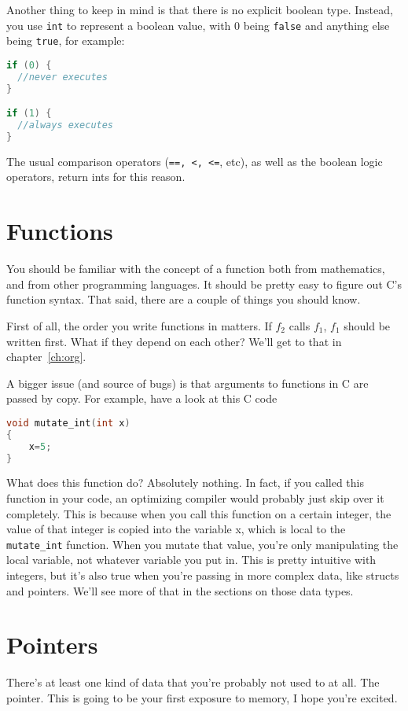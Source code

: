 \documentclass[ebook,11pt,oneside,openany]{memoir}
\newcommand{\cf}[1]{\texttt{#1}}
\begin{document}
Another thing to keep in mind is that there is no explicit boolean type. Instead, you use \texttt{int} to represent a boolean value, with 0 being \texttt{false} and anything else being \texttt{true}, for example:

\begin{lstlisting}[language=C]
if (0) {
  //never executes
}

if (1) {
  //always executes
}
\end{lstlisting}

The usual comparison operators (\texttt{==, <, <=}, etc), as well as the boolean logic operators, return ints for this reason.

\section{Functions}
You should be familiar with the concept of a function both from mathematics, and from other programming languages. It should be pretty easy to figure out C's function syntax. That said, there are a couple of things you should know.

First of all, the order you write functions in matters. If $f_2$ calls $f_1$, $f_1$ should be written first. What if they depend on each other? We'll get to that in chapter~\ref{ch:org}.

A bigger issue (and source of bugs) is that arguments to functions in C are passed by copy. For example, have a look at this C code

\begin{lstlisting}[language=C]
void mutate_int(int x)
{
	x=5;
}
\end{lstlisting}

What does this function do? Absolutely nothing. In fact, if you called this function in your code, an optimizing compiler would probably just skip over it completely. This is because when you call this function on a certain integer, the value of that integer is copied into the variable x, which is local to the \cf{mutate\_int} function. When you mutate that value, you're only manipulating the local variable, not whatever variable you put in. This is pretty intuitive with integers, but it's also true when you're passing in more complex data, like structs and pointers. We'll see more of that in the sections on those data types.

\section{Pointers}
There's at least one kind of data that you're probably not used to at all. The pointer. This is going to be your first exposure to memory, I hope you're excited.
\end{document}
